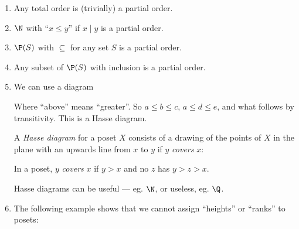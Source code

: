 \documentclass[a4paper]{article}
\begin{document}
\begin{eg}\leavevmode
  \begin{enumerate}
    \item Any total order is (trivially) a partial order.
    \item $\N$ with ``$x\leq y$'' if $x \mid y$ is a partial order.
    \item $\P(S)$ with $\subseteq$ for any set $S$ is a partial order.
    \item Any subset of $\P(S)$ with inclusion is a partial order.
    \item We can use a diagram
      \begin{center}
      \end{center}
      Where ``above'' means ``greater''. So $a \leq b\leq c$, $a \leq d\leq e$, and what follows by transitivity. This is a Hasse diagram.

      \begin{defi}
        A \emph{Hasse diagram} for a poset $X$ consists of a drawing of the points of $X$ in the plane with an upwards line from $x$ to $y$ if $y$ \emph{covers} $x$:
      \end{defi}
      \begin{defi}[Cover]
        In a poset, $y$ \emph{covers} $x$ if $y > x$ and no $z$ has $y > z > x$.
      \end{defi}
      Hasse diagrams can be useful --- eg. $\N$, or useless, eg. $\Q$.
    \item The following example shows that we cannot assign ``heights'' or ``ranks'' to posets:
      \begin{center}
\end{center}
\end{enumerate}
\end{eg}
\end{document}
